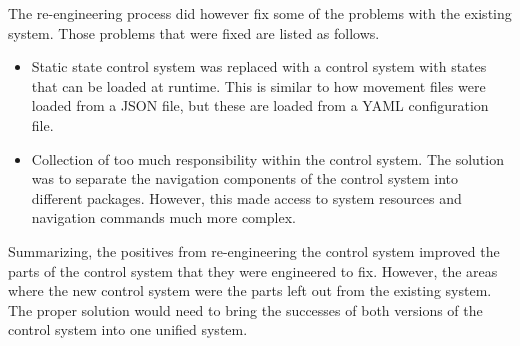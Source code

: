 \documentclass[
12pt, %
oneside, %
english, %
singlespacing, %
parskip, %
headsepline, %
chapterinoneline, %
]{MastersDoctoralThesis} %
\begin{document}
The re-engineering process did however fix some of the problems with the
existing system. Those problems that were fixed are listed as follows.

\begin{itemize}
\item Static state control system was replaced with a control system with states
  that can be loaded at runtime.
  This is similar to how movement files were loaded from a JSON file, but these
  are loaded from a YAML configuration file.
\item Collection of too much responsibility within the control system.
  The solution was to separate the navigation components of the control system
  into different packages. However, this made access to system resources and
  navigation commands much more complex.
\end{itemize}

Summarizing, the positives from re-engineering the control system improved the
parts of the control system that they were engineered to fix.
However, the areas where the new control system were the parts left out from the
existing system.
The proper solution would need to bring the successes of both versions of the
control system into one unified system.

\printglossaries %


\mainmatter %

\pagestyle{thesis} %









\appendix %


%
%
%



\end{document}
